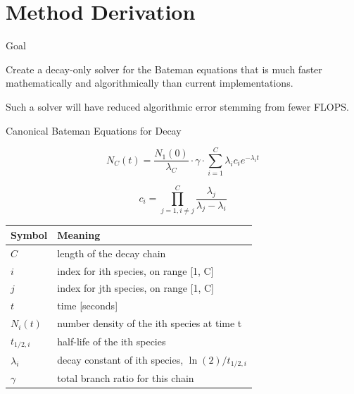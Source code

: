 \documentclass[xcolor=x11names,compress]{beamer}
\begin{document}
\section{Method Derivation}
\begin{frame}{Goal}

    \vspace*{3em}
    Create a decay-only solver for the Bateman equations 
    that is much faster mathematically and algorithmically than current 
    implementations. 

    \vspace*{1em}
    Such a solver will have reduced algorithmic error stemming from fewer 
    FLOPS.
    
\end{frame}

\begin{frame}{Canonical Bateman Equations for Decay}

\begin{equation}
\label{bm-eq}
N_C(t) = \frac{N_1(0)}{\lambda_C} \cdot \gamma \cdot \sum_{i=1}^C \lambda_i c_{i} e^{-\lambda_i t}
\end{equation}

\begin{equation}
\label{c_i}
c_i = \prod_{j=1,i\ne j}^C \frac{\lambda_j}{\lambda_j - \lambda_i}
\end{equation}

\begin{table}[hbt]
\label{decay-symbol-meaning}
\begin{tabular}{|l|l|}
\hline
\textbf{Symbol} & \textbf{Meaning} \\
\hline
$C$         & length of the decay chain\\
$i$         & index for ith species, on range [1, C]\\
$j$         & index for jth species, on range [1, C]\\
$t$         & time [seconds]\\
$N_i(t)$    & number density of the ith species at time t\\
$t_{1/2,i}$ & half-life of the ith species\\
$\lambda_i$ & decay constant of ith species, $\ln(2)/t_{1/2,i}$\\
$\gamma$    & total branch ratio for this chain\\
\hline
\end{tabular}
\end{table}
    
\end{frame}
\end{document}
